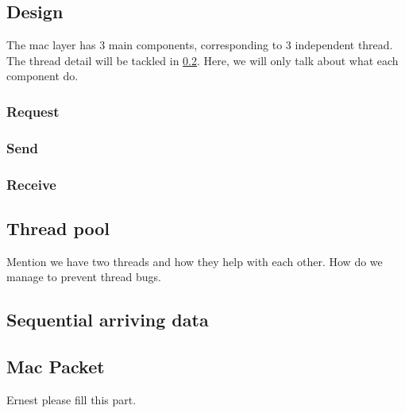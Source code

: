 \documentclass[conference,compsoc]{IEEEtran}
\begin{document}
	\subsection{Design}
		The mac layer has 3 main components, corresponding to 3 independent thread. The thread detail will be tackled in \ref{Thread pool}. Here, we will only talk about what each component do.
		\subsubsection{Request}
		\subsubsection{Send}
		\subsubsection{Receive}

	\subsection{Thread pool}\label{Thread pool}
		Mention we have two threads and how they help with each other.
		How do we manage to prevent thread bugs.
	
	\subsection{Sequential arriving data}
	
	\subsection{Mac Packet}
		Ernest please fill this part.
	
\end{document}
